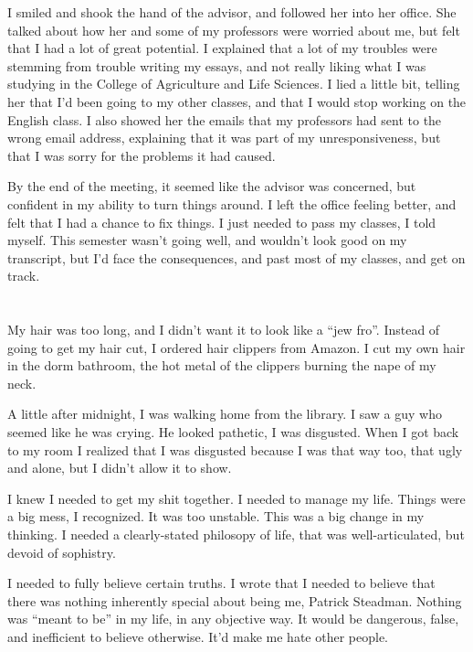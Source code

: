 I smiled and shook the hand of the advisor, and followed her into her office.
She talked about how her and some of my professors were worried about me, but
felt that I had a lot of great potential.  I explained that a lot of my troubles
were stemming from trouble writing my essays, and not really liking what I was
studying in the College of Agriculture and Life Sciences.  I lied a little bit,
telling her that I'd been going to my other classes, and that I would stop
working on the English class.  I also showed her the emails that my professors
had sent to the wrong email address, explaining that it was part of my
unresponsiveness, but that I was sorry for the problems it had caused.

By the end of the meeting, it seemed like the advisor was concerned, but
confident in my ability to turn things around.  I left the office feeling
better, and felt that I had a chance to fix things.  I just needed to pass my
classes, I told myself.  This semester wasn't going well, and wouldn't look good
on my transcript, but I'd face the consequences, and past most of my classes,
and get on track.

\section{}

My hair was too long, and I didn't want it to look like a ``jew fro''.  Instead of
going to get my hair cut, I ordered hair clippers from Amazon.  I cut my own
hair in the dorm bathroom, the hot metal of the clippers burning the nape of my
neck.  

A little after midnight, I was walking home from the library.  I saw a guy who
seemed like he was crying.  He looked pathetic, I was disgusted.  When I got
back to my room I realized that I was disgusted because I was that way too, that
ugly and alone, but I didn't allow it to show. 

I knew I needed to get my shit together.  I needed to manage my life.  Things
were a big mess, I recognized.  It was too unstable.  This was a big change in
my thinking.  I needed a clearly-stated philosopy of life, that was
well-articulated, but devoid of sophistry.

I needed to fully believe certain truths.  I wrote that I needed to believe that
there was nothing inherently special about being me, Patrick Steadman.  Nothing
was ``meant to be'' in my life, in any objective way.  It would be dangerous,
false, and inefficient to believe otherwise.  It'd make me hate other people.


